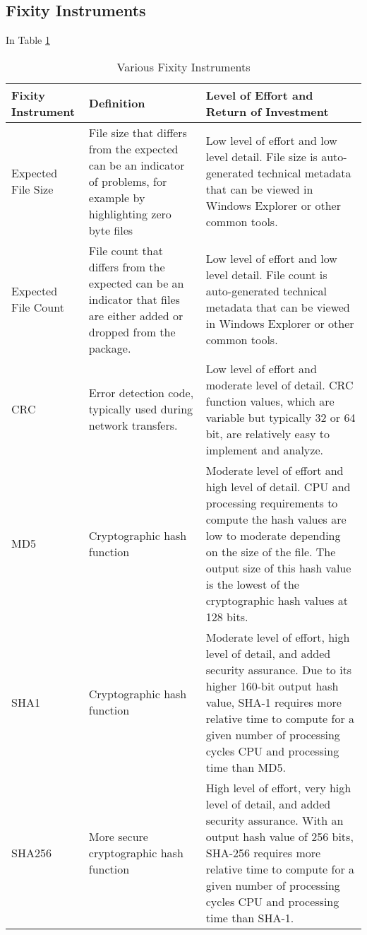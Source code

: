 \subsection{Fixity Instruments}
In Table \ref{tb:fixity-instruments} 
\begin{table}[t]
    \centering
    \caption{Various Fixity Instruments \cite[6]{ndsa2017fixity}}
    \label{tb:fixity-instruments}
    \begin{tabular}{p{}|p{}|p{}}
     Fixity Instrument & Definition & Level of Effort and Return of Investment \\ 
     \hline
     Expected File Size & File size that differs from the expected can be an indicator of problems, for example by highlighting zero byte files & Low level of effort and low level detail. File size is auto-generated technical metadata that can be viewed in Windows Explorer or other common tools. \\  
     \hline
     Expected File Count & File count that differs from the expected can be an indicator that files are either added or dropped from the package. & Low level of effort and low level detail. File count is auto-generated technical metadata that can be viewed in Windows Explorer or other common tools.  \\
     \hline
     CRC & Error detection code, typically used during network transfers. & Low level of effort and moderate level of detail. CRC function values, which are variable but typically 32 or 64 bit, are relatively easy to implement and analyze.  \\
     \hline
     MD5 & Cryptographic hash function & Moderate level of effort and high level of detail. CPU and processing requirements to compute the hash values are low to moderate depending on the size of the file. The output size of this hash value is the lowest of the cryptographic hash values at 128 bits.  \\
     \hline
     SHA1 & Cryptographic hash function & Moderate level of effort, high level of detail, and added security assurance. Due to its higher 160-bit output hash value, SHA-1 requires more relative time to compute for a given number of processing cycles CPU and processing time than MD5.  \\
     \hline
     SHA256 & More secure cryptographic hash function & High level of effort, very high level of detail, and added security assurance. With an output hash value of 256 bits, SHA-256 requires more relative time to compute for a given number of processing cycles CPU and processing time than SHA-1. 
    \end{tabular}
\end{table}
